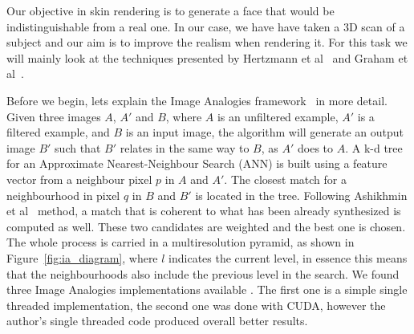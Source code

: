 \documentclass[11pt]{article}
\begin{document}
Our objective in skin rendering is to generate a face that would be indistinguishable from a real one.
In our case, we have have taken a 3D scan of a subject and our aim is to improve the realism when rendering it.
For this task we will mainly look at the techniques presented by Hertzmann et al~\cite{Hertzmann2001} and Graham et al~\cite{Graham2013}.

Before we begin, lets explain the Image Analogies framework~\cite{Hertzmann2001} in more detail.
Given three images $A$, $A'$ and $B$, where $A$ is an unfiltered example, $A'$ is a filtered example, and $B$ is an input image, the algorithm will generate an output image $B'$ such that $B'$ relates in the same way to $B$, as $A'$ does to $A$.
A k-d tree for an Approximate Nearest-Neighbour Search (ANN) is built using a feature vector from a neighbour pixel $p$ in $A$ and $A'$.
The closest match for a neighbourhood in pixel $q$ in $B$ and $B'$ is located in the tree.
Following Ashikhmin et al~\cite{Ashikhmin2001} method, a match that is coherent to what has been already synthesized is computed as well.
These two candidates are weighted and the best one is chosen.
The whole process is carried in a multiresolution pyramid, as shown in Figure~\ref{fig:ia_diagram}, where $l$ indicates the current level, in essence this means that the neighbourhoods also include the previous level in the search.
We found three Image Analogies implementations available \cite{ImAnSingleThreadWeb, ImAnCudaWeb, ImAnHertzmannWeb}.
The first one is a simple single threaded implementation, the second one was done with CUDA, however the author's single threaded code produced overall better results.
\end{document}
